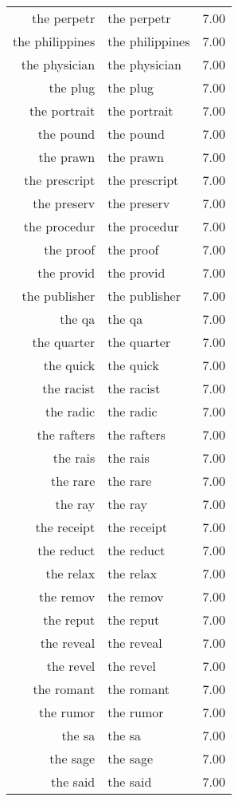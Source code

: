 \begin{table}[ht]
\begin{tabular}{rlr}
  the perpetr & the perpetr & 7.00 \\ 
  the philippines & the philippines & 7.00 \\ 
  the physician & the physician & 7.00 \\ 
  the plug & the plug & 7.00 \\ 
  the portrait & the portrait & 7.00 \\ 
  the pound & the pound & 7.00 \\ 
  the prawn & the prawn & 7.00 \\ 
  the prescript & the prescript & 7.00 \\ 
  the preserv & the preserv & 7.00 \\ 
  the procedur & the procedur & 7.00 \\ 
  the proof & the proof & 7.00 \\ 
  the provid & the provid & 7.00 \\ 
  the publisher & the publisher & 7.00 \\ 
  the qa & the qa & 7.00 \\ 
  the quarter & the quarter & 7.00 \\ 
  the quick & the quick & 7.00 \\ 
  the racist & the racist & 7.00 \\ 
  the radic & the radic & 7.00 \\ 
  the rafters & the rafters & 7.00 \\ 
  the rais & the rais & 7.00 \\ 
  the rare & the rare & 7.00 \\ 
  the ray & the ray & 7.00 \\ 
  the receipt & the receipt & 7.00 \\ 
  the reduct & the reduct & 7.00 \\ 
  the relax & the relax & 7.00 \\ 
  the remov & the remov & 7.00 \\ 
  the reput & the reput & 7.00 \\ 
  the reveal & the reveal & 7.00 \\ 
  the revel & the revel & 7.00 \\ 
  the romant & the romant & 7.00 \\ 
  the rumor & the rumor & 7.00 \\ 
  the sa & the sa & 7.00 \\ 
  the sage & the sage & 7.00 \\ 
  the said & the said & 7.00 \\ 

\end{tabular}
\end{table}
